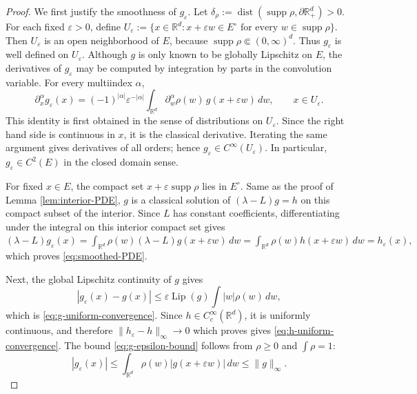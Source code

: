 \documentclass[aihp]{imsart}
\numberwithin{equation}{section}
\theoremstyle{plain}
\theoremstyle{definition}
\newcommand{\Lip}{\operatorname{Lip}}
\newcommand{\1}{\mathbf 1}
\newcommand{\abs}[1]{\left\lvert #1\right\rvert}
\begin{document}
\begin{proof} We first justify the smoothness of \(g_\varepsilon\). Let $\delta_\rho:=\operatorname{dist}(\operatorname{supp}\rho,\partial \mathbb R_+^d)>0 .$
For each fixed \(\varepsilon>0\), define $U_\varepsilon
        :=
        \{x\in\mathbb R^d: x+\varepsilon w\in E^\circ
          \text{ for every } w\in\operatorname{supp}\rho\}.$ Then \(U_\varepsilon\) is an open neighborhood of \(E\), because
\(\operatorname{supp}\rho\Subset(0,\infty)^d\). Thus \(g_\varepsilon\) is well defined on
\(U_\varepsilon\). Although \(g\) is only known to be
globally Lipschitz on \(E\), the derivatives of \(g_\varepsilon\) may be computed by
integration by parts in the convolution variable. For every multiindex \(\alpha\),
\[
        \partial_x^\alpha g_\varepsilon(x)
        =
        (-1)^{|\alpha|}\varepsilon^{-|\alpha|}
        \int_{\mathbb R^d}
        \partial_w^\alpha\rho(w)\,g(x+\varepsilon w)\,dw,
        \qquad x\in U_\varepsilon .
\tag{4.10}
\]
This identity is first obtained in the sense of distributions on \(U_\varepsilon\). Since
the right hand side is continuous in \(x\), it is the classical derivative. Iterating the
same argument gives derivatives of all orders; hence \(g_\varepsilon\in C^\infty(U_\varepsilon)\).
In particular, \(g_\varepsilon\in C^2(E)\) in the closed domain sense.

For fixed \(x\in E\), the compact set \(x+\varepsilon\operatorname{supp}\rho\) lies in
\(E^\circ\). Same as the proof of Lemma \ref{lem:interior-PDE}, \(g\) is a classical solution of $(\lambda-L)g=h$ on this compact subset of the interior. Since \(L\) has constant coefficients, differentiating
under the integral on this interior compact set gives $(\lambda-L)g_\varepsilon(x)
        =
        \int_{\mathbb R^d}\rho(w)(\lambda-L)g(x+\varepsilon w)\,dw  =
        \int_{\mathbb R^d}\rho(w)h(x+\varepsilon w)\,dw
        =
        h_\varepsilon(x),$ which proves \eqref{eq:smoothed-PDE}.


Next, the global Lipschitz continuity of \(g\) gives
\[
 \abs{g_\varepsilon(x)-g(x)}
 \le\varepsilon\Lip(g)\int\abs{w}\rho(w)\,dw,
\]
which is \eqref{eq:g-uniform-convergence}. Since \(h\in C_c^\infty(\mathbb R^d)\), it is uniformly continuous, and therefore $\|h_\varepsilon-h\|_\infty\to 0$ which proves gives \eqref{eq:h-uniform-convergence}.
The bound \eqref{eq:g-epsilon-bound} follows from $\rho\ge0$ and $\int\rho=1$:
\[
        |g_\varepsilon(x)|
        \le
        \int_{\mathbb R^d}\rho(w)|g(x+\varepsilon w)|\,dw
        \le
        \|g\|_\infty .
\]


\end{proof}
\end{document}
